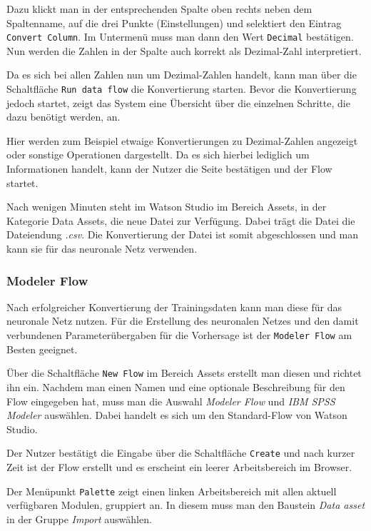 Dazu klickt man in der entsprechenden Spalte oben rechts neben dem Spaltenname, auf die drei Punkte (Einstellungen) und
selektiert den Eintrag \texttt{Convert Column}. Im Untermenü muss man dann den Wert \texttt{Decimal} bestätigen. Nun
werden die Zahlen in der Spalte auch korrekt als Dezimal-Zahl interpretiert.

Da es sich bei allen Zahlen nun um Dezimal-Zahlen handelt, kann man über die Schaltfläche \texttt{Run data flow} die
Konvertierung starten. Bevor die Konvertierung jedoch startet, zeigt das System eine Übersicht über die einzelnen
Schritte, die dazu benötigt werden, an.

Hier werden zum Beispiel etwaige Konvertierungen zu Dezimal-Zahlen angezeigt oder sonstige Operationen dargestellt. Da
es sich hierbei lediglich um Informationen handelt, kann der Nutzer die Seite bestätigen und der Flow startet.

Nach wenigen Minuten steht im Watson Studio im Bereich Assets, in der Kategorie Data Assets, die neue Datei zur
Verfügung. Dabei trägt die Datei die Dateiendung \textit{.csv}. Die Konvertierung der Datei ist somit abgeschlossen und
man kann sie für das neuronale Netz verwenden.

\subsubsection{Modeler Flow}
\label{subsub:modeler_flow}
Nach erfolgreicher Konvertierung der Trainingsdaten kann man diese für das neuronale Netz nutzen. Für die Erstellung
des neuronalen Netzes und den damit verbundenen Parameterübergaben für die Vorhersage ist der \texttt{Modeler Flow} am
Besten geeignet.

Über die Schaltfläche \texttt{New Flow} im Bereich Assets erstellt man diesen und richtet ihn ein. Nachdem man einen
Namen und eine optionale Beschreibung für den Flow eingegeben hat, muss man die Auswahl \textit{Modeler Flow} und
\textit{IBM SPSS Modeler} auswählen. Dabei handelt es sich um den Standard-Flow von Watson Studio.

Der Nutzer bestätigt die Eingabe über die Schaltfläche \texttt{Create} und nach kurzer Zeit ist der Flow erstellt und es
erscheint ein leerer Arbeitsbereich im Browser.

Der Menüpunkt \texttt{Palette} zeigt einen linken Arbeitsbereich mit allen aktuell verfügbaren Modulen, gruppiert an. In
diesem muss man den Baustein \textit{Data asset} in der Gruppe \textit{Import} auswählen.

